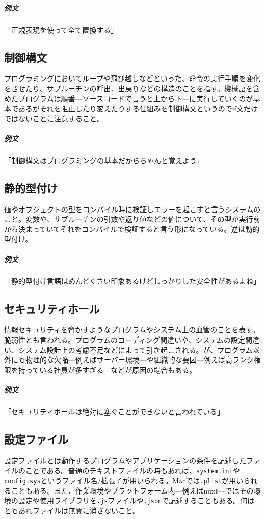 \documentclass[a4paper]{ltjsreport}
\newcommand{\terlogy}[2][|]{\colorbox{terlogy}{\texttt{\lstinline#1#2#1}}}
\begin{document}
\subparagraph{例文}「正規表現を使って全て置換する」

\subsection{制御構文}
プログラミングにおいてループや飛び越しなどといった、命令の実行手順を変化をさせたり、サブルーチンの呼出、出戻りなどの構造のことを指す。機械語を含めたプログラムは順番---ソースコードで言うと上から下---に実行していくのが基本であるがそれを阻止したり変えたりする仕組みを制御構文というのでif文だけではないことに注意すること。

\subparagraph{例文}「制御構文はプログラミングの基本だからちゃんと覚えよう」

\subsection{静的型付け}
値やオブジェクトの型をコンパイル時に検証しエラーを起こすと言うシステムのこと。変数や、サブルーチンの引数や返り値などの値について、その型が実行前から決まっていてそれをコンパイルで検証すると言う形になっている。逆は動的型付け。

\subparagraph{例文}「静的型付け言語はめんどくさい印象あるけどしっかりした安全性があるよね」

\subsection{セキュリティホール}
情報セキュリティを脅かすようなプログラムやシステム上の血管のことを表す。脆弱性とも言われる。プログラムのコーディング間違いや、システムの設定間違い、システム設計上の考慮不足などによって引き起こされる。が、プログラム以外にも物理的な欠陥---例えばサーバー環境---や組織的な要因---例えば高ランク権限を持っている社員が多すぎる---などが原因の場合もある。

\subparagraph{例文}「セキュリティホールは絶対に塞ぐことができないと言われている」

\subsection{設定ファイル}
設定ファイルとは動作するプログラムやアプリケーションの条件を記述したファイルのことである。普通のテキストファイルの時もあれば、\terlogy{system.ini}や\terlogy{config.sys}というファイル名/拡張子が用いられる。Macでは\terlogy{.plist}が用いられることもある。また、作業環境やプラットフォーム内---例えばnuxt---ではその環境の設定や使用ライブラリを\terlogy{.js}ファイルや\terlogy{.json}で記述することもある。何はともあれファイルは無闇に消さないこと。
\end{document}
